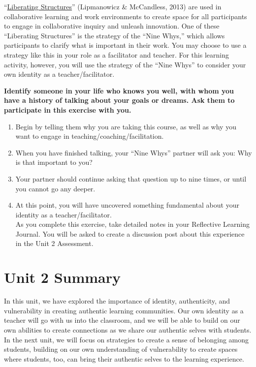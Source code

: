 \documentclass[
]{book}
\providecommand{\tightlist}{%
  \setlength{\itemsep}{0pt}\setlength{\parskip}{0pt}}
\begin{document}
\begin{reflect}
``\href{https://www.liberatingstructures.com/ls-menu}{Liberating
Structures}'' (Lipmanowicz \& McCandless, 2013) are used in
collaborative learning and work environments to create space for all
participants to engage in collaborative inquiry and unleash innovation.
One of these ``Liberating Structures'' is the strategy of the ``Nine
Whys,'' which allows participants to clarify what is important in their
work. You may choose to use a strategy like this in your role as a
facilitator and teacher. For this learning activity, however, you will
use the strategy of the ``Nine Whys'' to consider your own identity as a
teacher/facilitator.

\textbf{Identify someone in your life who knows you well, with whom you
have a history of talking about your goals or dreams. Ask them to
participate in this exercise with you.}

\begin{enumerate}
\def\labelenumi{\arabic{enumi}.}
\tightlist
\item
  Begin by telling them why you are taking this course, as well as why
  you want to engage in teaching/coaching/facilitation.\\
\item
  When you have finished talking, your ``Nine Whys'' partner will ask
  you: Why is that important to you?\\
\item
  Your partner should continue asking that question up to nine times, or
  until you cannot go any deeper.\\
\item
  At this point, you will have uncovered something fundamental about
  your identity as a teacher/facilitator.\\
  As you complete this exercise, take detailed notes in your Reflective
  Learning Journal. You will be asked to create a discussion post about
  this experience in the Unit 2 Assessment.
\end{enumerate}
\end{reflect}

\hypertarget{unit-2-summary}{%
\section*{Unit 2 Summary}\label{unit-2-summary}}

In this unit, we have explored the importance of identity, authenticity, and vulnerability in creating authentic learning communities. Our own identity as a teacher will go with us into the classroom, and we will be able to build on our own abilities to create connections as we share our authentic selves with students. In the next unit, we will focus on strategies to create a sense of belonging among students, building on our own understanding of vulnerability to create spaces where students, too, can bring their authentic selves to the learning experience.
\end{document}
